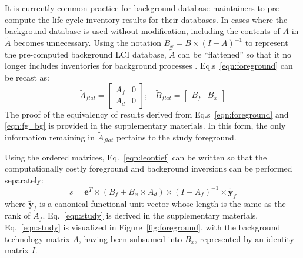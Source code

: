 
It is currently common practice for background database maintainers to pre-compute the life cycle inventory results for their databases.  In cases where the background database is used without modification, including the contents of $A$ in $\tilde{A}$ becomes unnecessary.
Using the notation $B_x = B \times (I - A)^{-1}$ to represent the pre-computed background LCI database, $\tilde{A}$ can be ``flattened'' so that it no longer includes inventories for background processes \citep{Kuczenski_JLCA_2015}.
Eq.s~\ref{eqn:foreground} can be recast as:
\begin{equation}
 \tilde{A}_{flat} = \left[\begin{array}{cc} 
A_f &  0 \\
A_d & 0 
   \end{array}\right];\;\;\;  \tilde{B}_{flat} = \left[\begin{array}{cc} B_f & B_x \end{array}\right ]
\label{eqn:fg_bg}
\end{equation}
The proof of the equivalency of results derived from Eq.s~\ref{eqn:foreground} and \ref{eqn:fg_bg} is provided in the supplementary materials.  In this form, the only information remaining in $\tilde{A}_{flat}$ pertains to the study foreground.  

Using the ordered matrices, Eq.~\ref{eqn:leontief} can be written so that the computationally costly foreground and background inversions can be performed separately:
\begin{equation}
s = \mathbf{e}^T \times (B_f + B_x\times A_d) \times (I - A_f)^{-1} \times \tilde{\mathbf{y}}_f
\label{eqn:study}
\end{equation}
where $\tilde{\mathbf{y}}_f$ is a canonical functional unit vector whose length is the same as the rank of $A_f$. Eq.~\ref{eqn:study} is derived in the supplementary materials.
Eq.~\ref{eqn:study} is visualized in Figure~\ref{fig:foreground}, with the background technology matrix $A$, having been subsumed into $B_x$, represented by an identity matrix $I$.  

